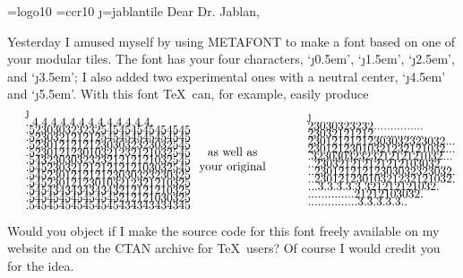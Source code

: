 \nopagenumbers
\font\logo=logo10
\font\rm=ccr10
\font\j=jablantile
\parindent=0pt
\null\vskip1.5in
\bigskip
Dear Dr. Jablan,

\bigskip
\def\\#1{{\j#1\kern.5em}}
Yesterday I amused myself by using {\logo METAFONT} to make a font
based on one of your modular tiles.
The font has your four characters, `\\0', `\\1', `\\2', and `\\3';
I also added two experimental ones with a neutral center,
`\\4' and `\\5'. With this font \TeX\ can, for example, easily produce
$$\vcenter{\j\hsize=14em\offinterlineskip\obeylines
..4.4.4.4.4.4.4.4.4.4.4.4.4.
.523030323232545454545454545
.523032121212545454545454545
.523012121212303032323032545
.523012123010321232121032545
.543230303232321212121032545
.545230321212121212103032545
.545230121212123030323230325
.545230121230103212321210325
.545434343434343212121210325
.545454545454545212121030325
.545454545454545434343434345
}\qquad\vcenter{\halign{\hfil#\hfil\cr as well as\cr your original\cr}}\qquad
\vcenter{\j\hsize=14em\offinterlineskip\obeylines
23030323232...............
23032121212...............
23012121212303032323032...
23012123010321232121032...
.3230303232321212121032...
..230321212121212103032...
..23012121212303032323032.
..23012123010321232121032.
...3.3.3.3.3.321212121032.
..............21212103032.
...............3.3.3.3.3..
}$$

\bigskip
Would you object if I make the source code for this font
freely available on my website and on the CTAN archive for
\TeX\ users? Of course I would credit you for the idea.

\bigskip
{}
\vfill\bye

